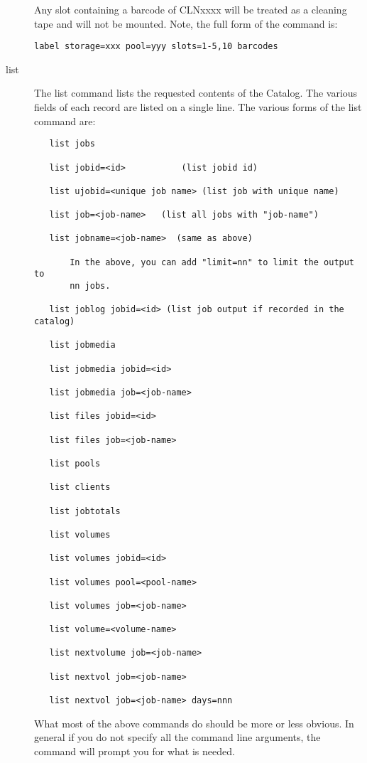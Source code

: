 \begin{description}
Any slot containing a barcode of CLNxxxx will be treated as a cleaning tape
and will not be mounted.  Note, the full form of the command is:

\footnotesize
\begin{verbatim}
label storage=xxx pool=yyy slots=1-5,10 barcodes
\end{verbatim}
\normalsize

\item [list]
   The list command lists the requested contents of the Catalog.  The
   various fields of each record are listed on a single line.  The various
   forms of the list command are:
\footnotesize
\begin{verbatim}
   list jobs

   list jobid=<id>           (list jobid id)

   list ujobid=<unique job name> (list job with unique name)

   list job=<job-name>   (list all jobs with "job-name")

   list jobname=<job-name>  (same as above)

       In the above, you can add "limit=nn" to limit the output to
       nn jobs.

   list joblog jobid=<id> (list job output if recorded in the catalog)

   list jobmedia

   list jobmedia jobid=<id>

   list jobmedia job=<job-name>

   list files jobid=<id>

   list files job=<job-name>

   list pools

   list clients

   list jobtotals

   list volumes

   list volumes jobid=<id>

   list volumes pool=<pool-name>

   list volumes job=<job-name>

   list volume=<volume-name>

   list nextvolume job=<job-name>

   list nextvol job=<job-name>

   list nextvol job=<job-name> days=nnn

\end{verbatim}
\normalsize

   What most of the above commands do should be more or less obvious.  In
   general if you do not specify all the command line arguments, the
   command will prompt you for what is needed.


\end{description}

